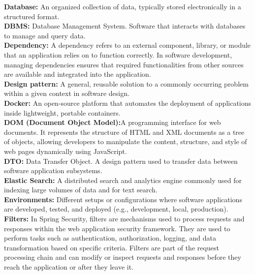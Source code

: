 \textbf{Database:} An organized collection of data, typically stored electronically in a structured format.\\

\textbf{DBMS:} Database Management System. Software that interacts with databases to manage and query data.\\


\textbf{Dependency:} A dependency refers to an external component, library, or module that an application relies on to function correctly. In software development, managing dependencies ensures that required functionalities from other sources are available and integrated into the application.\\

\textbf{Design pattern:} A general, reusable solution to a commonly occurring problem within a given context in software design.\\

\textbf{Docker:} An open-source platform that automates the deployment of applications inside lightweight, portable containers.\\

\textbf{DOM (Document Object Model):}A programming interface for web documents. It represents the structure of HTML and XML documents as a tree of objects, allowing developers to manipulate the content, structure, and style of web pages dynamically using JavaScript.\\

\textbf{DTO:} Data Transfer Object. A design pattern used to transfer data between software application subsystems.\\

\textbf{Elastic Search:} A distributed search and analytics engine commonly used for indexing large volumes of data and for text search.\\

\textbf{Environments:} Different setups or configurations where software applications are developed, tested, and deployed (e.g., development, local, production).\\

\textbf{Filters:} In Spring Security, filters are mechanisms used to process requests and responses within the web application security framework. They are used to perform tasks such as authentication, authorization, logging, and data transformation based on specific criteria. Filters are part of the request processing chain and can modify or inspect requests and responses before they reach the application or after they leave it.\\

